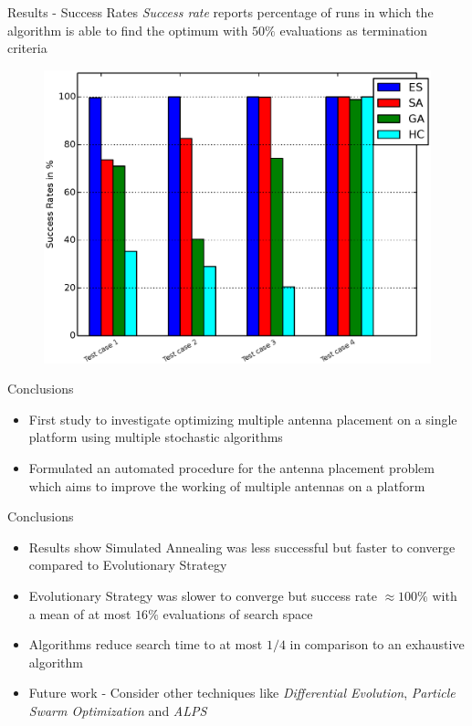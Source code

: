 \documentclass{beamer}
\begin{document}
\begin{frame}{Results - Success Rates}
    \textit{Success rate} reports percentage of runs in which the algorithm is able to find the optimum with $50\%$ evaluations as termination criteria
    \begin{figure}
        \vspace*{-0.35cm}
        \centering
        \includegraphics[scale=0.4]{../paper/FIG/tc_sp}
    \end{figure}
\end{frame}

\begin{frame}{Conclusions}
\begin{itemize} \itemsep1.5em
        \item First study to investigate optimizing multiple antenna placement on a single platform using multiple stochastic algorithms
        \item Formulated an automated procedure for the antenna placement problem which aims to improve the working of multiple antennas on a platform
    \end{itemize}
\end{frame}

\begin{frame}{Conclusions}
\begin{itemize} \itemsep1.5em
        \item Results show Simulated Annealing was less successful but faster to converge compared to Evolutionary Strategy
        \item Evolutionary Strategy was slower to converge but success rate $\approx100\%$ with a mean of at most $16\%$ evaluations of search space 
        \item Algorithms reduce search time to at most $1/4$ in comparison to an exhaustive algorithm
        \item Future work - Consider other techniques like \textit{Differential Evolution}, \textit{Particle Swarm Optimization} and \textit{ALPS}
    \end{itemize}
\end{frame}
\end{document}
